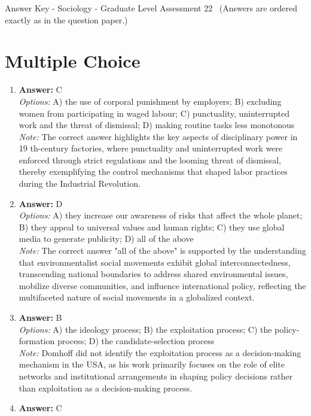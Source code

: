 \documentclass[12pt]{article}
\begin{document}
\begin{center}
Answer Key - Sociology - Graduate Level Assessment 22 \
\small (Answers are ordered exactly as in the question paper.)
\end{center}

\section*{Multiple Choice}
\begin{enumerate}[label=\arabic*.]
\item \textbf{Answer:} C
\\ \textit{Options:} A) the use of corporal punishment by employers; B) excluding women from participating in waged labour; C) punctuality, uninterrupted work and the threat of dismissal; D) making routine tasks less monotonous
\\ \textit{Note:} The correct answer highlights the key aspects of disciplinary power in 19 th-century factories, where punctuality and uninterrupted work were enforced through strict regulations and the looming threat of dismissal, thereby exemplifying the control mechanisms that shaped labor practices during the Industrial Revolution.
\item \textbf{Answer:} D
\\ \textit{Options:} A) they increase our awareness of risks that affect the whole planet; B) they appeal to universal values and human rights; C) they use global media to generate publicity; D) all of the above
\\ \textit{Note:} The correct answer "all of the above" is supported by the understanding that environmentalist social movements exhibit global interconnectedness, transcending national boundaries to address shared environmental issues, mobilize diverse communities, and influence international policy, reflecting the multifaceted nature of social movements in a globalized context.
\item \textbf{Answer:} B
\\ \textit{Options:} A) the ideology process; B) the exploitation process; C) the policy-formation process; D) the candidate-selection process
\\ \textit{Note:} Domhoff did not identify the exploitation process as a decision-making mechanism in the USA, as his work primarily focuses on the role of elite networks and institutional arrangements in shaping policy decisions rather than exploitation as a decision-making process.
\item \textbf{Answer:} C

\end{enumerate}
\end{document}

